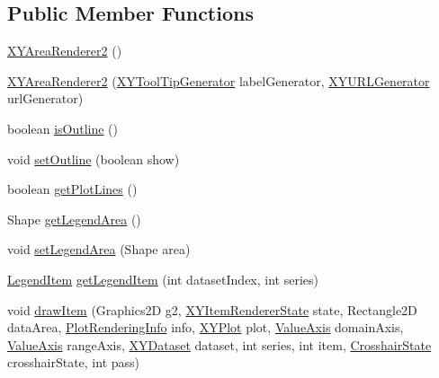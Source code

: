 \subsection*{Public Member Functions}
\begin{DoxyCompactItemize}
\item 
\mbox{\hyperlink{classorg_1_1jfree_1_1chart_1_1renderer_1_1xy_1_1_x_y_area_renderer2_a5b4f5eb7eb9224acdb1aeb1e825f5c77}{X\+Y\+Area\+Renderer2}} ()
\item 
\mbox{\hyperlink{classorg_1_1jfree_1_1chart_1_1renderer_1_1xy_1_1_x_y_area_renderer2_af8f59b9965ad4ac0c6c33b90f88f99ad}{X\+Y\+Area\+Renderer2}} (\mbox{\hyperlink{interfaceorg_1_1jfree_1_1chart_1_1labels_1_1_x_y_tool_tip_generator}{X\+Y\+Tool\+Tip\+Generator}} label\+Generator, \mbox{\hyperlink{interfaceorg_1_1jfree_1_1chart_1_1urls_1_1_x_y_u_r_l_generator}{X\+Y\+U\+R\+L\+Generator}} url\+Generator)
\item 
boolean \mbox{\hyperlink{classorg_1_1jfree_1_1chart_1_1renderer_1_1xy_1_1_x_y_area_renderer2_ab5287c12f7f6aaf8f366abf749f9b4a3}{is\+Outline}} ()
\item 
void \mbox{\hyperlink{classorg_1_1jfree_1_1chart_1_1renderer_1_1xy_1_1_x_y_area_renderer2_af03e003f432240e40ea8aa8c0b5a3638}{set\+Outline}} (boolean show)
\item 
boolean \mbox{\hyperlink{classorg_1_1jfree_1_1chart_1_1renderer_1_1xy_1_1_x_y_area_renderer2_ac5a7ece9f22d937cdf8cd3eba3654e7c}{get\+Plot\+Lines}} ()
\item 
Shape \mbox{\hyperlink{classorg_1_1jfree_1_1chart_1_1renderer_1_1xy_1_1_x_y_area_renderer2_a67fbcc139864b42ebf6a7955a0f1980b}{get\+Legend\+Area}} ()
\item 
void \mbox{\hyperlink{classorg_1_1jfree_1_1chart_1_1renderer_1_1xy_1_1_x_y_area_renderer2_a315e00656c54d8f88ef86f4b7205c42e}{set\+Legend\+Area}} (Shape area)
\item 
\mbox{\hyperlink{classorg_1_1jfree_1_1chart_1_1_legend_item}{Legend\+Item}} \mbox{\hyperlink{classorg_1_1jfree_1_1chart_1_1renderer_1_1xy_1_1_x_y_area_renderer2_aceed297cd6a487760ce33af182edd8c0}{get\+Legend\+Item}} (int dataset\+Index, int series)
\item 
void \mbox{\hyperlink{classorg_1_1jfree_1_1chart_1_1renderer_1_1xy_1_1_x_y_area_renderer2_a472953c4ef7f86db3907265bff0ba675}{draw\+Item}} (Graphics2D g2, \mbox{\hyperlink{classorg_1_1jfree_1_1chart_1_1renderer_1_1xy_1_1_x_y_item_renderer_state}{X\+Y\+Item\+Renderer\+State}} state, Rectangle2D data\+Area, \mbox{\hyperlink{classorg_1_1jfree_1_1chart_1_1plot_1_1_plot_rendering_info}{Plot\+Rendering\+Info}} info, \mbox{\hyperlink{classorg_1_1jfree_1_1chart_1_1plot_1_1_x_y_plot}{X\+Y\+Plot}} plot, \mbox{\hyperlink{classorg_1_1jfree_1_1chart_1_1axis_1_1_value_axis}{Value\+Axis}} domain\+Axis, \mbox{\hyperlink{classorg_1_1jfree_1_1chart_1_1axis_1_1_value_axis}{Value\+Axis}} range\+Axis, \mbox{\hyperlink{interfaceorg_1_1jfree_1_1data_1_1xy_1_1_x_y_dataset}{X\+Y\+Dataset}} dataset, int series, int item, \mbox{\hyperlink{classorg_1_1jfree_1_1chart_1_1plot_1_1_crosshair_state}{Crosshair\+State}} crosshair\+State, int pass)

\end{DoxyCompactItemize}
